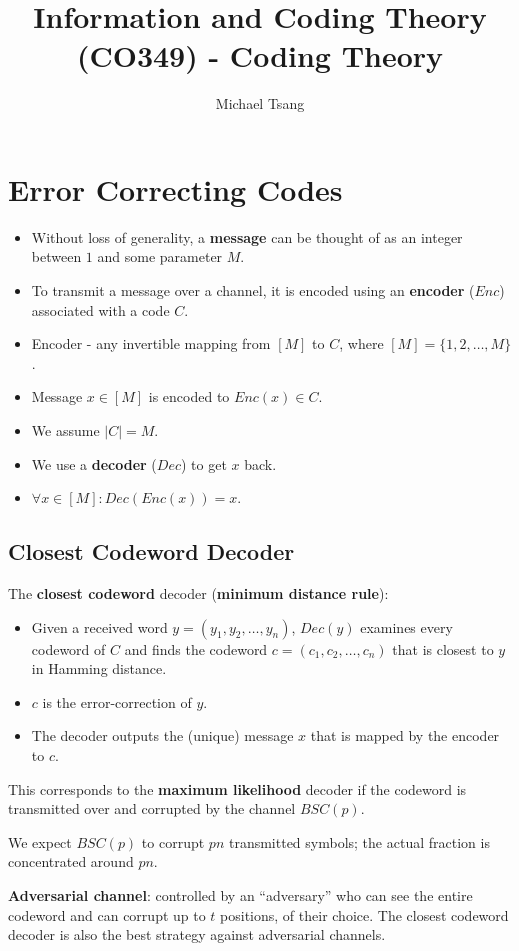 \documentclass[11pt]{article}
\title{Information and Coding Theory (CO349) - Coding Theory}
\author{Michael Tsang}
\begin{document}
\maketitle

\section{Error Correcting Codes}
\begin{itemize}
  \item Without loss of generality, a \textbf{message} can be thought of as an integer between $1$ and some parameter $M$.
  \item To transmit a message over a channel, it is encoded using an \textbf{encoder} ($Enc$) associated with a code $C$.
  \item Encoder - any invertible mapping from $[M]$ to $C$, where $[M] = \{ 1, 2, \ldots, M\}$.
  \item Message $x \in [M]$ is encoded to $Enc(x) \in C$.
  \item We assume $\lvert C \rvert = M$.
  \item We use a \textbf{decoder} ($Dec$) to get $x$ back.
  \item $\forall x \in [M] : Dec(Enc(x)) = x$.
\end{itemize}

\subsection{Closest Codeword Decoder}
The \textbf{closest codeword} decoder (\textbf{minimum distance rule}):
\begin{itemize}
  \item Given a received word $y = (y_1, y_2, \ldots, y_n)$, $Dec(y)$ examines every codeword of $C$ and finds the codeword $c = (c_1, c_2, \ldots, c_n)$ that is closest to $y$ in Hamming distance.
  \item $c$ is the error-correction of $y$.
  \item The decoder outputs the (unique) message $x$ that is mapped by the encoder to $c$.
\end{itemize}

This corresponds to the \textbf{maximum likelihood} decoder if the codeword is transmitted over and corrupted by the channel $BSC(p)$.

We expect $BSC(p)$ to corrupt $pn$ transmitted symbols; the actual fraction is concentrated around $pn$.

\textbf{Adversarial channel}: controlled by an ``adversary'' who can see the entire codeword and can corrupt up to $t$ positions, of their choice.
The closest codeword decoder is also the best strategy against adversarial channels.
\end{document}
